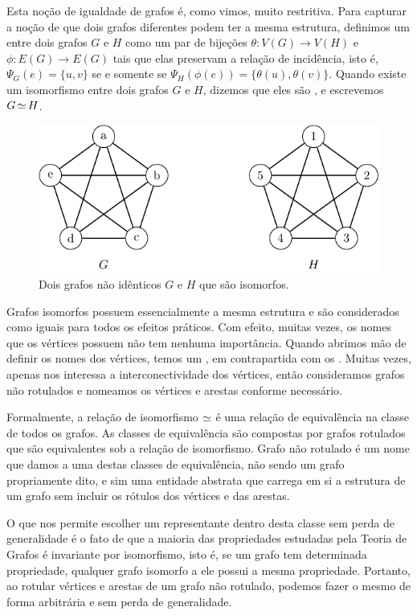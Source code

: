 Esta noção de igualdade de grafos é, como vimos, muito restritiva. Para capturar a noção de que dois grafos diferentes podem ter a mesma estrutura, definimos um  entre dois grafos $G$ e $H$ como um par de bijeções $\theta : V(G) \to V(H)$ e $\phi : E(G) \to E(G)$ tais que elas preservam a relação de incidência, isto é, $\Psi_G(e) = \{u,v\}$ se e somente se $\Psi_H(\phi(e)) = \{\theta(u),\theta(v)\}$. Quando existe um isomorfismo entre dois grafos $G$ e $H$, dizemos que eles são , e escrevemos $G \operatorname{\simeq} H$.

\begin{figure}[ht!]
\centering
\includegraphics{figures/1_intro_2_iso}
\caption{Dois grafos não idênticos $G$ e $H$ que são isomorfos.}
\label{fig:intro:iso}
\end{figure}

Grafos isomorfos possuem essencialmente a mesma estrutura e são considerados como iguais para todos os efeitos práticos. Com efeito, muitas vezes, os nomes que os vértices possuem não tem nenhuma importância. Quando abrimos mão de definir os nomes dos vértices, temos um , em contrapartida com os . Muitas vezes, apenas nos interessa a interconectividade dos vértices, então consideramos grafos não rotulados e nomeamos os vértices e arestas conforme necessário.

Formalmente, a relação de isomorfismo $\operatorname{\simeq}$ é uma relação de equivalência na classe de todos os grafos. As classes de equivalência são compostas por grafos rotulados que são equivalentes sob a relação de isomorfismo. Grafo não rotulado é um nome que damos a uma destas classes de equivalência, não sendo um grafo propriamente dito, e sim uma entidade abstrata que carrega em si a estrutura de um grafo sem incluir os rótulos dos vértices e das arestas.

O que nos permite escolher um representante dentro desta classe sem perda de generalidade é o fato de que a maioria das propriedades estudadas pela Teoria de Grafos é invariante por isomorfismo, isto é, se um grafo tem determinada propriedade, qualquer grafo isomorfo a ele possui a mesma propriedade. Portanto, ao rotular vértices e arestas de um grafo não rotulado, podemos fazer o mesmo de forma arbitrária e sem perda de generalidade.


